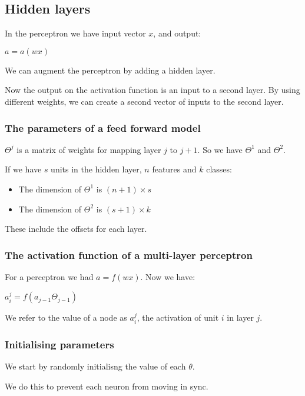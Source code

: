 
\subsection{Hidden layers}

In the perceptron we have input vector \(x\), and output:

\(a=a(wx)\)

We can augment the perceptron by adding a hidden layer.

Now the output on the activation function is an input to a second layer. By using different weights, we can create a second vector of inputs to the second layer.

\subsubsection{The parameters of a feed forward model}

\(\Theta^{j}\) is a matrix of weights for mapping layer \(j\) to \(j+1\). So we have \(\Theta^1\) and \(\Theta^2\).

If we have \(s\) units in the hidden layer, \(n\) features and \(k\) classes:

\begin{itemize}
\item The dimension of \(\Theta^1\) is \((n+1) \times s\)
\item The dimension of \(\Theta^2\) is \((s+1) \times k\)
\end{itemize}

These include the offsets for each layer.

\subsubsection{The activation function of a multi-layer perceptron}

For a perceptron we had \(a=f(wx)\). Now we have:

\(a_i^j=f(a_{j-1}\Theta_{j-1})\)

We refer to the value of a node as \(a_i^{j}\), the activation of unit \(i\) in layer \(j\).

\subsubsection{Initialising parameters}

We start by randomly initialisng the value of each \(\theta \).

We do this to prevent each neuron from moving in sync.

